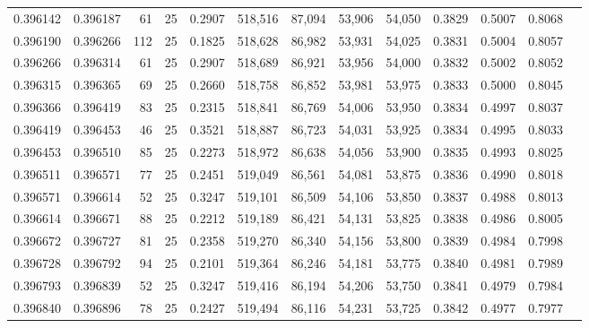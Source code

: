 \begin{tabular}{rrrrrrrrrrrrr}
0.396142 & 0.396187 &    61 &  25 &                                     0.2907 & 518,516 &  87,094 &  53,906 &  54,050 & 0.3829 & 0.5007 & 0.8068 \\
0.396190 & 0.396266 &   112 &  25 &                                     0.1825 & 518,628 &  86,982 &  53,931 &  54,025 & 0.3831 & 0.5004 & 0.8057 \\
0.396266 & 0.396314 &    61 &  25 &                                     0.2907 & 518,689 &  86,921 &  53,956 &  54,000 & 0.3832 & 0.5002 & 0.8052 \\
0.396315 & 0.396365 &    69 &  25 &                                     0.2660 & 518,758 &  86,852 &  53,981 &  53,975 & 0.3833 & 0.5000 & 0.8045 \\
0.396366 & 0.396419 &    83 &  25 &                                     0.2315 & 518,841 &  86,769 &  54,006 &  53,950 & 0.3834 & 0.4997 & 0.8037 \\
0.396419 & 0.396453 &    46 &  25 &                                     0.3521 & 518,887 &  86,723 &  54,031 &  53,925 & 0.3834 & 0.4995 & 0.8033 \\
0.396453 & 0.396510 &    85 &  25 &                                     0.2273 & 518,972 &  86,638 &  54,056 &  53,900 & 0.3835 & 0.4993 & 0.8025 \\
0.396511 & 0.396571 &    77 &  25 &                                     0.2451 & 519,049 &  86,561 &  54,081 &  53,875 & 0.3836 & 0.4990 & 0.8018 \\
0.396571 & 0.396614 &    52 &  25 &                                     0.3247 & 519,101 &  86,509 &  54,106 &  53,850 & 0.3837 & 0.4988 & 0.8013 \\
0.396614 & 0.396671 &    88 &  25 &                                     0.2212 & 519,189 &  86,421 &  54,131 &  53,825 & 0.3838 & 0.4986 & 0.8005 \\
0.396672 & 0.396727 &    81 &  25 &                                     0.2358 & 519,270 &  86,340 &  54,156 &  53,800 & 0.3839 & 0.4984 & 0.7998 \\
0.396728 & 0.396792 &    94 &  25 &                                     0.2101 & 519,364 &  86,246 &  54,181 &  53,775 & 0.3840 & 0.4981 & 0.7989 \\
0.396793 & 0.396839 &    52 &  25 &                                     0.3247 & 519,416 &  86,194 &  54,206 &  53,750 & 0.3841 & 0.4979 & 0.7984 \\
0.396840 & 0.396896 &    78 &  25 &                                     0.2427 & 519,494 &  86,116 &  54,231 &  53,725 & 0.3842 & 0.4977 & 0.7977 \\

\end{tabular}
